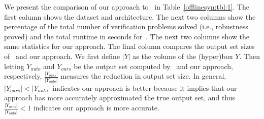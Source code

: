 We present the comparison of our approach to~\autolipra{} in
Table~\ref{offlinesyn:tbl:1}.
The first column shows the dataset and architecture. The next two columns show
the percentage of the total number of verification problems solved (i.e.,
robustness proved) and the total runtime in seconds for~\autolipra{}. The next
two columns show the same statistics for our approach. The final column
compares the
output set sizes of~\autolipra{} and our approach. We first define $ |Y| $ as
the volume of the (hyper)box $ Y $. Then letting $ Y_{auto} $ and $ Y_{ours} $
be the output set computed by~\autolipra{} and our approach, respectively, $
\frac{|Y_{ours}|}{|Y_{auto}|} $ measures the reduction in output set size. In
general, $ |Y_{ours} | < | Y_{auto} | $ indicates our approach is better
because it implies that our approach has more accurately approximated the true
output set, and thus $ \frac{|Y_{ours}|}{|Y_{auto}|} < 1 $ indicates our
approach is more accurate.

